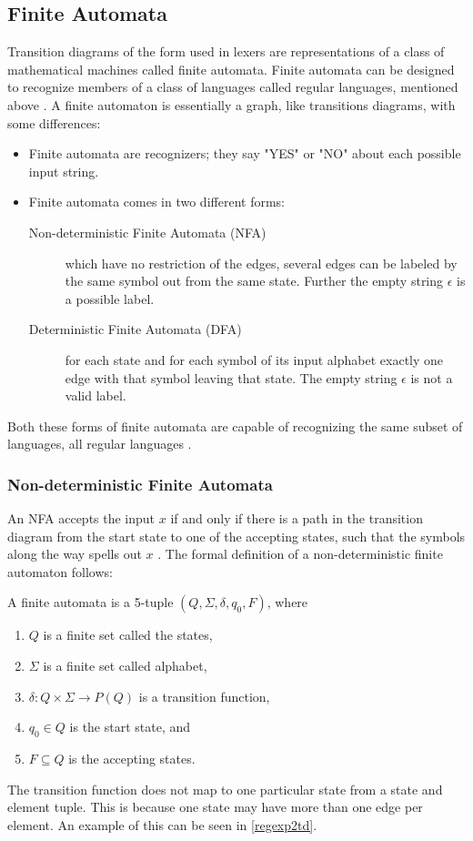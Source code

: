 \subsection{Finite Automata}
Transition diagrams of the form used in lexers are representations of a class 
of mathematical machines called finite automata. Finite automata can be 
designed to recognize members of a class of languages called regular languages, 
mentioned above \cite{sebesta2012}.
A finite automaton is essentially a graph, like transitions diagrams, with some 
differences:
\begin{itemize}
  \item Finite automata are recognizers; they say "YES" or "NO" about 
each possible input string.
  \item Finite automata comes in two different forms:
    \begin{description}
      \item [Non-deterministic Finite Automata (NFA)] which have no restriction 
of the edges, several edges can be labeled by the same symbol out from the 
same state. Further the empty string $\epsilon$ is a possible label. 
      \item [Deterministic Finite Automata (DFA)] for each state and for each 
symbol of its input alphabet exactly one edge with that symbol leaving that 
state. The empty string $\epsilon$ is not a valid label.
    \end{description}
\end{itemize}
Both these forms of finite automata are capable of recognizing the same 
subset of languages, all regular languages \cite{Aho2006}.

\subsubsection{Non-deterministic Finite Automata}
An NFA accepts the input $x$ if and only if there is a path in the transition 
diagram from the start state to one of the accepting states, such that the 
symbols along the way spells out $x$ \cite{Aho2006}.
The formal definition of a non-deterministic finite automaton follows:
\begin{definition} \label{finiteAutomataDef}
A finite automata is a 5-tuple $(Q, \Sigma, \delta, q_0, F)$, where
\begin{enumerate}
  \item $Q$ is a finite set called the states,
  \item $\Sigma$ is a finite set called alphabet,
  \item $\delta: Q \times \Sigma \to P(Q)$ is a transition function,
  \item $q_0 \in Q$ is the start state, and
  \item $F \subseteq Q$ is the accepting states.
\end{enumerate} 
\end{definition}
The transition function does not map to one particular state from a
state and element tuple. This is because one state may have more than one edge
per element. An example of this can be seen in \cref{regexp2td}.

